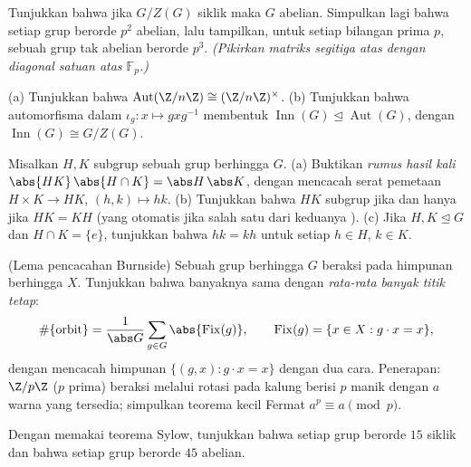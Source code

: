 \begin{exercise}[$\star$]\label{exo:b3:groups:2}
Tunjukkan bahwa jika $G/Z(G)$ siklik maka $G$ abelian. Simpulkan lagi
bahwa setiap grup berorde $p^2$ abelian, lalu tampilkan, untuk setiap
bilangan prima $p$, sebuah grup tak abelian berorde $p^3$. \emph{(Pikirkan
matriks segitiga atas dengan diagonal satuan atas $\mathbb F_p$.)}
\end{exercise}

\begin{exercise}[$\star$]\label{exo:b3:groups:3}
(a) Tunjukkan bahwa $\operatorname{Aut}(\Z/n\Z) \cong (\Z/n\Z)^\times$.
(b) Tunjukkan bahwa automorfisma dalam $\iota_g \colon x \mapsto
gxg^{-1}$ membentuk  $\operatorname{Inn}(G)
\trianglelefteq \operatorname{Aut}(G)$, dengan
$\operatorname{Inn}(G) \cong G/Z(G)$.
\end{exercise}

\begin{exercise}[$\star\star$]\label{exo:b3:groups:4}
Misalkan $H, K$ subgrup sebuah grup berhingga $G$.
(a) Buktikan \emph{rumus hasil kali} $\abs{HK}\,\abs{H\cap K} =
\abs H\, \abs K$, dengan mencacah serat pemetaan $H \times K
\to HK$, $(h,k) \mapsto hk$.
(b) Tunjukkan bahwa $HK$ subgrup jika dan hanya jika $HK = KH$ (yang otomatis jika salah
satu dari keduanya ).
(c) Jika $H, K \trianglelefteq G$ dan $H \cap K = \{e\}$, tunjukkan bahwa
$hk = kh$ untuk setiap $h \in H$, $k \in K$.
\end{exercise}

\begin{exercise}[$\star\star$]\label{exo:b3:groups:5}
(Lema pencacahan Burnside) Sebuah grup berhingga $G$ beraksi pada himpunan
berhingga $X$. Tunjukkan bahwa banyaknya  sama dengan \emph{rata-rata
banyak titik tetap}:
\[
\#\{\text{orbit}\} = \frac{1}{\abs G}\sum_{g \in G}
\abs{\operatorname{Fix}(g)},
\qquad \operatorname{Fix}(g) = \{x \in X : g \cdot x = x\},
\]
dengan mencacah himpunan $\{(g,x) : g\cdot x = x\}$ dengan dua cara.
Penerapan: $\Z/p\Z$ ($p$ prima) beraksi melalui rotasi pada kalung berisi
$p$ manik dengan $a$ warna yang tersedia; simpulkan teorema kecil
Fermat $a^p \equiv a \pmod p$.
\end{exercise}

\begin{exercise}[$\star$]\label{exo:b3:groups:6}
Dengan memakai teorema Sylow, tunjukkan bahwa setiap grup berorde $15$
siklik dan bahwa setiap grup berorde $45$ abelian.
\end{exercise}

